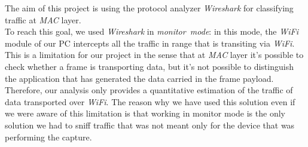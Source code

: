 The aim of this project is using the protocol analyzer \textit{Wireshark} for classifying traffic at \textit{MAC} layer.\\ 
To reach this goal, we used \textit{Wireshark} in \textit{monitor\ mode}: in this mode, the \textit{WiFi} module of our PC
intercepts all the traffic in range that is transiting via \textit{WiFi}.\\ 
This is a limitation for our project in the sense that at \textit{MAC} layer it's possible to check whether a frame is transporting data, but it's 
not possible to distinguish the application that has generated the data carried in the frame payload. Therefore, our 
analysis only provides a quantitative estimation of the traffic of data transported over \textit{WiFi}. The reason why we have 
used this solution even if we were aware of this limitation is that working in monitor mode is the only solution we had
to sniff traffic that was not meant only for the device that was performing the capture.\\

